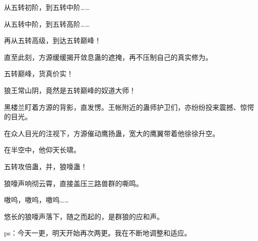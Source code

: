 \begin{this_body}
从五转初阶，到五转中阶……

从五转中阶，到五转高阶……

再从五转高级，到达五转巅峰！

直至此刻，方源缓缓揭开敛息蛊的遮掩，再不压制自己的真实修为。

五转巅峰，货真价实！

狼王常山阴，竟然是五转巅峰的奴道大师！

黑楼兰盯着方源的背影，直发愣。王帐附近的蛊师护卫们，亦纷纷投来震撼、惊愕的目光。

在众人目光的注视下，方源催动鹰扬蛊，宽大的鹰翼带着他徐徐升空。

在半空中，他仰天长啸。

五转攻倍蛊，并，狼嚎蛊！

狼嚎声响彻云霄，直接盖压三路兽群的嘶鸣。

嗷呜，嗷呜，嗷呜……

悠长的狼嚎声落下，随之而起的，是群狼的应和声。

ps：今天一更，明天开始再次两更。我在不断地调整和适应。

\end{this_body}

